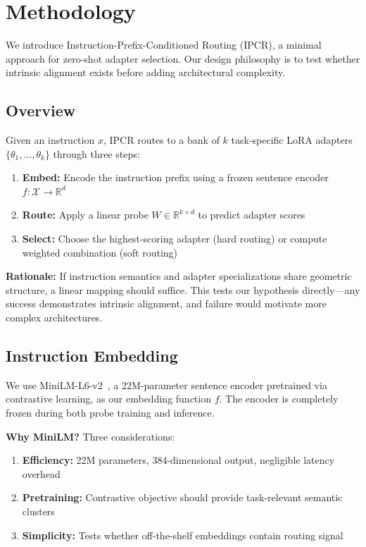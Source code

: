 \section{Methodology}
\label{sec:methodology}

We introduce Instruction-Prefix-Conditioned Routing (IPCR), a minimal approach for zero-shot adapter selection. Our design philosophy is to test whether intrinsic alignment exists before adding architectural complexity.

\subsection{Overview}

Given an instruction $x$, IPCR routes to a bank of $k$ task-specific LoRA adapters $\{\theta_1, \ldots, \theta_k\}$ through three steps:

\begin{enumerate}
    \item \textbf{Embed:} Encode the instruction prefix using a frozen sentence encoder $f: \mathcal{X} \rightarrow \mathbb{R}^d$
    \item \textbf{Route:} Apply a linear probe $W \in \mathbb{R}^{k \times d}$ to predict adapter scores
    \item \textbf{Select:} Choose the highest-scoring adapter (hard routing) or compute weighted combination (soft routing)
\end{enumerate}

\textbf{Rationale:} If instruction semantics and adapter specializations share geometric structure, a linear mapping should suffice. This tests our hypothesis directly---any success demonstrates intrinsic alignment, and failure would motivate more complex architectures.

\subsection{Instruction Embedding}

We use MiniLM-L6-v2~\cite{wang2020minilm}, a 22M-parameter sentence encoder pretrained via contrastive learning, as our embedding function $f$. The encoder is completely frozen during both probe training and inference.

\textbf{Why MiniLM?} Three considerations:
\begin{enumerate}
    \item \textbf{Efficiency:} 22M parameters, 384-dimensional output, negligible latency overhead
    \item \textbf{Pretraining:} Contrastive objective should provide task-relevant semantic clusters
    \item \textbf{Simplicity:} Tests whether off-the-shelf embeddings contain routing signal
\end{enumerate}

